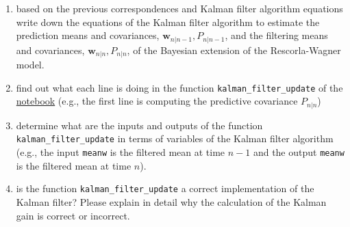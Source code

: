 \documentclass[12pt]{article}
\begin{document}
\begin{enumerate}
    \item based on the previous correspondences and Kalman filter algorithm equations write down the equations of the Kalman
        filter algorithm to estimate the prediction means and covariances,
        $\mathbf{w}_{n|n-1},P_{n|n-1}$, and the filtering means and
        covariances, $\mathbf{w}_{n|n},P_{n|n}$, of the Bayesian extension of
        the Rescorla-Wagner model.

    \item find out what each line is doing in the function
        \texttt{kalman\_filter\_update}
        of the
        \href{https://github.com/jessegeerts/RLforNeuroTutorial/blob/main/ReinforcementLearningDemo.ipynb}{notebook}
        (e.g., the first line is computing the predictive covariance $P_{n|n}$)

    \item determine what are the inputs and outputs of the function
        \texttt{kalman\_filter\_update} in terms of variables of the Kalman
        filter algorithm (e.g., the input \texttt{meanw} is the filtered mean at time
        $n-1$ and the output \texttt{meanw} is the filtered mean at time $n$).

    \item is the function \texttt{kalman\_filter\_update} a correct
        implementation of the Kalman filter? Please explain in detail why the
        calculation of the Kalman gain is correct or incorrect.

\end{enumerate}

% 
% 
\end{document}
